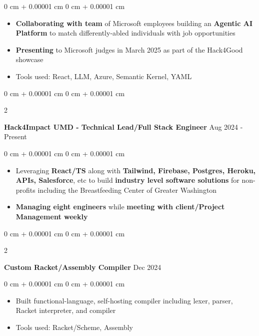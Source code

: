 \documentclass[10pt, letterpaper]{article}
\newenvironment{highlights}{
    \begin{itemize}[
        topsep=0.10 cm,
        parsep=0.10 cm,
        partopsep=0pt,
        itemsep=0pt,
        leftmargin=0 cm + 10pt
    ]
}{
    \end{itemize}
} %
\newenvironment{onecolentry}{
    \begin{adjustwidth}{
        0 cm + 0.00001 cm
    }{
        0 cm + 0.00001 cm
    }
}{
    \end{adjustwidth}
} %
\newenvironment{twocolentry}[2][]{
    \onecolentry
    \def\secondColumn{#2}
    \setcolumnwidth{\fill, 4.5 cm}
    \begin{paracol}{2}
}{
    \switchcolumn \raggedleft \secondColumn
    \end{paracol}
    \endonecolentry
} %
\begin{document}
        \vspace{0.10 cm}
        \begin{onecolentry}
            \begin{highlights}
                \item \textbf{Collaborating with team} of Microsoft employees building an \textbf{Agentic AI Platform} to match differently-abled individuals with job opportunities
                \item \textbf{Presenting} to Microsoft judges in March 2025 as part of the Hack4Good showcase
                \item Tools used: React, LLM, Azure, Semantic Kernel, YAML 
            \end{highlights}
        \end{onecolentry}


        \vspace{0.2 cm}

        \begin{twocolentry}{
            Aug 2024 - Present
        }
            \textbf{Hack4Impact UMD - Technical Lead/Full Stack Engineer}\end{twocolentry}

        \vspace{0.10 cm}
        \begin{onecolentry}
            \begin{highlights}
                \item Leveraging \textbf{React/TS} along with \textbf{Tailwind, Firebase, Postgres, Heroku, APIs, Salesforce}, etc to build \textbf{industry level software solutions} for non-profits including the Breastfeeding Center of Greater Washington
                \item \textbf{Managing eight engineers} while \textbf{meeting with client/Project Management weekly}
            \end{highlights}
        \end{onecolentry}


        \vspace{0.2 cm}

        \begin{twocolentry}{
            Dec 2024
        }
            \textbf{Custom Racket/Assembly Compiler}\end{twocolentry}

        \vspace{0.10 cm}
        \begin{onecolentry}
            \begin{highlights}
                \item Built functional-language, self-hosting compiler including lexer, parser, Racket interpreter, and compiler
                \item Tools used: Racket/Scheme, Assembly
            \end{highlights}
        \end{onecolentry}
\end{document}
